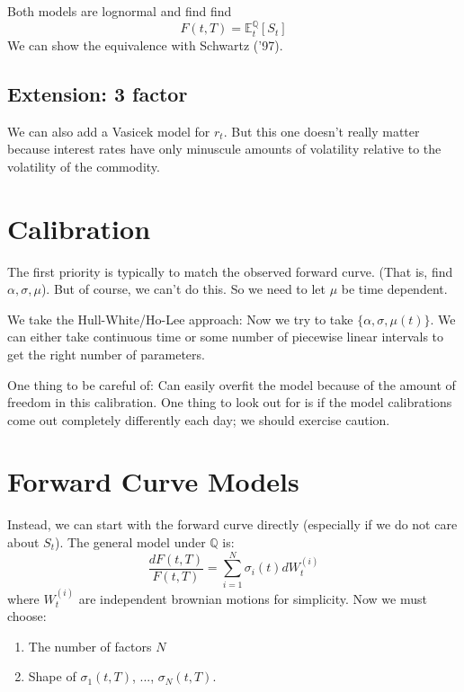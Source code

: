 Both models are lognormal and find find
\begin{equation}
	F(t,T) = \mathbb{E}_t^\mathbb{Q}[S_t]
\end{equation}
We can show the equivalence with Schwartz ('97).

\subsection{Extension: 3 factor}
We can also add a Vasicek model for $r_t$. But this one doesn't really matter because interest rates have only minuscule amounts of volatility relative to the volatility of the commodity.

\section{Calibration}
The first priority is typically to match the observed forward curve. (That is, find $\alpha, \sigma, \mu$). But of course, we can't do this. So we need to let $\mu$ be time dependent.

We take the Hull-White/Ho-Lee approach: Now we try to take $\{\alpha, \sigma, \mu(t)\}$. We can either take continuous time or some number of piecewise linear intervals to get the right number of parameters.

One thing to be careful of: Can easily overfit the model because of the amount of freedom in this calibration. One thing to look out for is if the model calibrations come out completely differently each day; we should exercise caution.

\section{Forward Curve Models}
Instead, we can start with the forward curve directly (especially if we do not care about $S_t$). The general model under $\mathbb{Q}$ is:
\begin{equation}
	\frac{dF(t,T)}{F(t,T)} = \sum_{i=1}^N \sigma_i(t) dW_t^{(i)}
\end{equation}
where $W_t^{(i)}$ are independent brownian motions for simplicity.  
Now we must choose:
\begin{enumerate}
	\item The number of factors $N$
	\item Shape of $\sigma_1(t,T)$, ..., $\sigma_N(t,T)$.
\end{enumerate}

